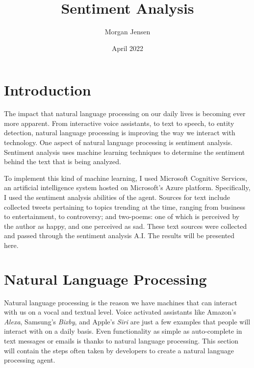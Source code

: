 \documentclass[]{article}
\title{Sentiment Analysis}
\author{Morgan Jensen}
\date{April 2022}
\begin{document}
    \maketitle
    \section{Introduction}
    The impact that natural language processing on our daily lives is becoming ever more apparent.
    From interactive voice assistants, to text to speech, to entity detection, natural language processing
    is improving the way we interact with technology. One aspect of natural language processing is 
    sentiment analysis. Sentiment analysis uses machine learning techniques to determine the sentiment
    behind the text that is being analyzed.

    To implement this kind of machine learning, I used Microsoft Cognitive Services, an artificial
    intelligence system hosted on Microsoft's Azure platform. Specifically, I used the sentiment 
    analysis abilities of the agent. Sources for text include collected tweets pertaining to topics
    trending at the time, ranging from business to entertainment, to controversy; and two-poems: one 
    of which is perceived by the author as happy, and one perceived as sad. These text sources were 
    collected and passed through the sentiment analysis A.I. The results will be presented here.

    \section{Natural Language Processing}
    Natural language processing is the reason we have machines that can interact with us on a vocal
    and textual level. Voice activated assistants like Amazon's \textit{Alexa}, Samsung's \textit{Bixby},
    and Apple's \textit{Siri} are just a few examples that people will interact with on a daily basis. Even
    functionality as simple as auto-complete in text messages or emails is thanks to natural language processing.
    This section will contain the steps often taken by developers to create a natural language processing agent.
\end{document}
